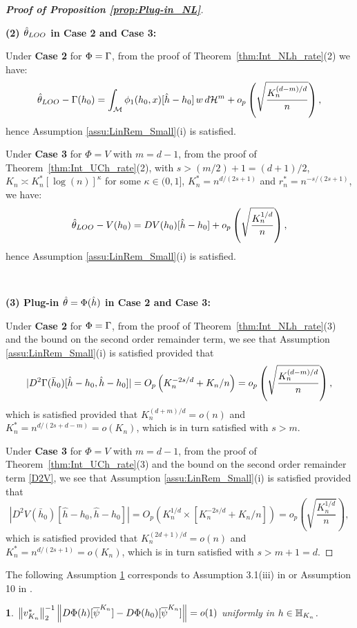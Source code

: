 \documentclass[12pt,american]{article}
\newcommand{\cH}{\mathcal{H}}
\theoremstyle{definition}
\theoremstyle{plain}
\newtheorem{assumption}{\protect\assumptionname}
\theoremstyle{definition}
\theoremstyle{plain}
\theoremstyle{plain}
\theoremstyle{plain}
\theoremstyle{plain}
\theoremstyle{plain}
\newcommand{\norm}[1]{\left\| #1 \right\|}
\providecommand{\assumptionname}{Assumption}
\providecommand{\assumptionname}{Assumption}
\begin{document}
\begin{proof}[\textbf{Proof of Proposition \ref{prop:Plug-in_NL}}]
~

\noindent\textbf{(2) $\hat{\theta}_{LOO}$ in Case 2 and Case 3:}

Under \textbf{Case 2} for $\Phi=\Gamma$, from the proof of Theorem~\ref{thm:Int_NLh_rate}(2)
we have:
\[
\hat{\t}_{LOO}-\G(h_0)=\int_\cM \phi_1(h_0,x)[\hat{h} - h_0]\, w\, d\cH^m +o_p\left( \sqrt{\frac{K_n^{(d-m)/d}}{n}}\right),
\]
hence Assumption \ref{assu:LinRem_Small}(i) is satisfied.

Under \textbf{Case 3} for $\Phi=V$ with $m=d-1$, from the proof of Theorem~\ref{thm:Int_UCh_rate}(2), with $s>(m/2)+1=(d+1)/2$, $K_{n}\asymp K^*_n [\log(n)]^{\kappa}$ for some $\kappa \in (0,1]$, $K^*_n=n^{d/(2s+1)}$ and $r^*_n=n^{-s/(2s+1)}$, we have:
\[
\hat{\theta}_{LOO}-V(h_0)=DV(h_0)[\hat{h} - h_0]+o_p\left( \sqrt{\frac{K_n^{1/d}}{n}}\right),
\]
hence Assumption \ref{assu:LinRem_Small}(i) is satisfied.

~

\noindent\textbf{(3) Plug-in $\hat{\theta}=\Phi(\hat{h})$ in Case 2 and Case 3:}

Under \textbf{Case 2} for $\Phi=\Gamma$, from the proof of Theorem~\ref{thm:Int_NLh_rate}(3) and the bound on the second order remainder term, we see that Assumption \ref{assu:LinRem_Small}(i) is satisfied provided that
\[
|D^2\Gamma(\bar{h}_0)[\hat{h} - h_0, \hat{h} - h_0]| = O_p\left(K_n^{-2s/d} + K_n/n\right)
=o_p\left( \sqrt{\frac{K_n^{(d-m)/d}}{n}}\right),
\]
which is satisfied provided that $K_n^{(d+m)/d}=o(n)$ and $K^*_n=n^{d/(2s+d-m)}=o(K_n)$, which is in turn satisfied with $s>m$.

Under \textbf{Case 3} for $\Phi=V$ with $m=d-1$, from the proof of Theorem~\ref{thm:Int_UCh_rate}(3) and the bound on the second order remainder term \eqref{D2V}, we see that Assumption \ref{assu:LinRem_Small}(i) is satisfied provided that
\[
|D^2V(\bar{h}_0)[\hat{h} - h_0, \hat{h} - h_0]| = O_p\left(K_n^{1/d}\times \left[K_n^{-2s/d} + K_n/n\right]\right)
=o_p\left( \sqrt{\frac{K_n^{1/d}}{n}}\right),
\]
which is satisfied provided that $K_n^{(2d+1)/d}=o(n)$ and $K^*_n=n^{d/(2s+1)}=o(K_n)$, which is in turn satisfied with $s>m+1=d$.

\end{proof}

The following Assumption \ref{assu:VarConsis} corresponds to Assumption 3.1(iii) in \cite*{chen2014sieve} or Assumption 10 in \cite{chen2015optimal}.

\begin{assumption}\label{assu:VarConsis}
    $\norm{v_{K_{n}}^{*}}_2^{-1}\norm{D\Phi(h)[\ol {\psi}^{K_n}] -  D\Phi(h_0)[\ol {\psi}^{K_n}]} = o(1)$ uniformly in $h\in \mathbb{H}_{K_{n}}$.
\end{assumption}
\end{document}
